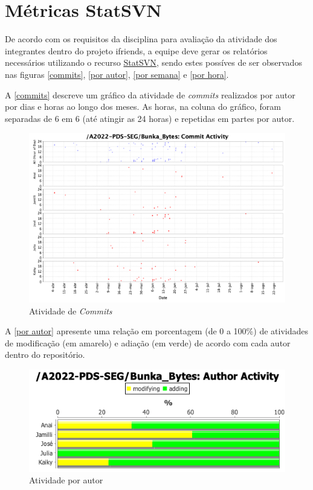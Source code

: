 \chapter{Métricas StatSVN}
De acordo com os requisitos da disciplina para avaliação da atividade dos integrantes dentro do projeto \gls{ifriends}, a equipe deve gerar os relatórios necessários utilizando o recurso \href{https://statsvn.org}{StatSVN}, sendo estes possíves de ser observados nas figuras \autoref{commits}, \autoref{por autor}, \autoref{por semana} e \autoref{por hora}.
\label{metricas_statsvn}

A \autoref{commits} descreve um gráfico da atividade de \textit{commits} realizados por autor por dias e horas ao longo dos meses. As horas, na coluna do gráfico, foram separadas de 6 em 6 (até atingir as 24 horas) e repetidas em partes por autor.
\begin{figure}[htb]
\centering
\caption{\label{commits} Atividade de \textit{Commits}}
\includegraphics[width=1.0\textwidth]{anexos/Imagens_Statsvn/atividade_de_commits.png}
\end{figure}
\FloatBarrier

A \autoref{por autor} apresente uma relação em porcentagem (de 0 a 100\%) de atividades de modificação (em amarelo) e adiação (em verde) de acordo com cada autor dentro do repositório.
\begin{figure}[htb]
\centering
\caption{\label{por autor} Atividade por autor}
\includegraphics[width=1.0\textwidth]{anexos/Imagens_Statsvn/atividades.png}
\end{figure}
\FloatBarrier

